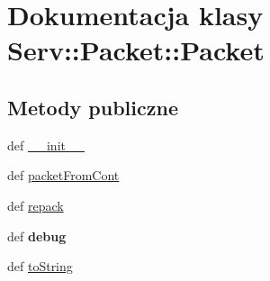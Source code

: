 \hypertarget{class_serv_1_1_packet_1_1_packet}{
\section{Dokumentacja klasy Serv::Packet::Packet}
\label{class_serv_1_1_packet_1_1_packet}
}
\subsection*{Metody publiczne}
\begin{CompactItemize}
\item 
def \hyperlink{class_serv_1_1_packet_1_1_packet_1f71ef65b348c86a047c87abe9ca2775}{\_\-\_\-init\_\-\_\-}
\item 
def \hyperlink{class_serv_1_1_packet_1_1_packet_393243697bc1e23d5adadc50698fccd1}{packetFromCont}
\item 
def \hyperlink{class_serv_1_1_packet_1_1_packet_6dab330b602405f42b3fe090863e5c1e}{repack}
\item 
\hypertarget{class_serv_1_1_packet_1_1_packet_ca58d8a6836377fbe433aae6290e087a}{
def \textbf{debug}}
\label{class_serv_1_1_packet_1_1_packet_ca58d8a6836377fbe433aae6290e087a}

\item 
def \hyperlink{class_serv_1_1_packet_1_1_packet_2738b48c8c177150338082c936c823dc}{toString}
\end{CompactItemize}
